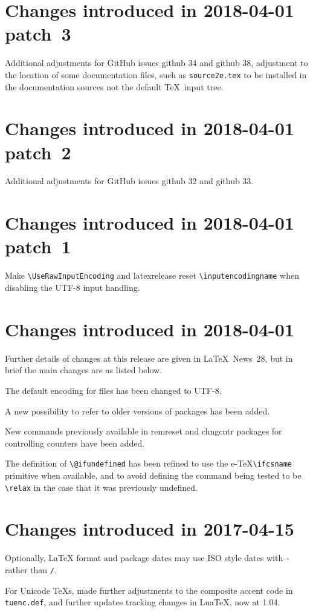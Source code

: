 \documentclass{ltxguide}
\newcommand\Lpack[1]{\mbox{\textsf{#1}}}
\newcommand\ghissue[1]{github #1}
\newcommand\ltnewsissue[1]{\LaTeX\ News~#1}
\newcommand\ghissue[1]{%
    \href{https://github.com/latex3/latex2e/issues/#1}{github #1}}
\newcommand\ltnewsissue[1]{%
    \href{https://www.latex-project.org/news/latex2e-news/ltnews#1.pdf}{\LaTeX\ News~#1}}
\begin{document}
\section{Changes  introduced in 2018-04-01 patch~3}
Additional adjustments for GitHub issues \ghissue{34} and \ghissue{38}, adjustment to the
location of some documentation files, such as \texttt{source2e.tex} to
be installed in the documentation sources not the default \TeX\ input
tree.


\section{Changes  introduced in 2018-04-01 patch~2}
Additional adjustments for GitHub issues  \ghissue{32} and  \ghissue{33}.

\section{Changes  introduced in 2018-04-01 patch~1}
Make \verb|\UseRawInputEncoding| and \Lpack{latexrelease} reset \verb|\inputencodingname|
when disabling the UTF-8 input handling.

\section{Changes  introduced in 2018-04-01}
Further details of changes at this release are given in \ltnewsissue{28}, but in brief
the main changes are as listed below.

The default encoding for files has been changed to UTF-8.

A new possibility to refer to older versions of packages has been added.

New commands previously available in \Lpack{remreset} and
\Lpack{chngcntr} packages for controlling counters have been added.

The definition of \verb|\@ifundefined| has been refined to use the e-\TeX \verb|\ifcsname|
primitive when available, and to avoid defining the command being tested to be \verb|\relax|
in the case that it was previously undefined.

\section{Changes  introduced in 2017-04-15}
Optionally, \LaTeX{} format and package dates may use ISO style dates with
\texttt{-}  rather than \texttt{/}.

For Unicode \TeX{}s, made further adjustments to the composite accent
code in \texttt{tuenc.def}, and further updates tracking changes in
Lua\TeX, now at 1.04.
\end{document}
